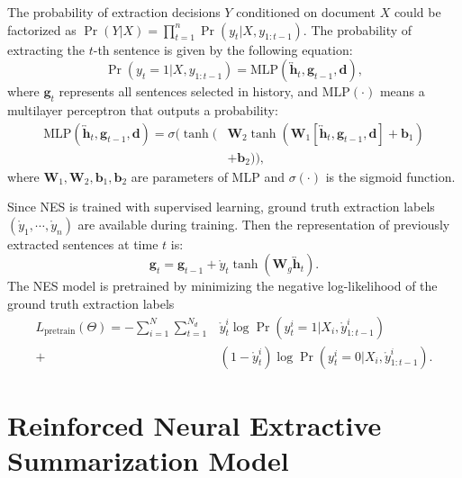 \documentclass[letterpaper]{article} %
\begin{document}
	The probability of extraction decisions $Y$ conditioned on document $X$ could be factorized as $\Pr(Y|X) = \prod_{t=1}^{n} \Pr(y_t | X, y_{1:t-1})$.
	The probability of extracting the $t$-th sentence is given by the following equation:
	\begin{equation} \label{eq:mlp}
		 \Pr(y_t=1|X, y_{1:t-1}) = \text{MLP}(\overleftrightarrow{\mathbf{h}}_t, \mathbf{g}_{t-1}, \mathbf{d} ) ,
	\end{equation}
	where $\mathbf{g}_t$ represents all sentences selected in history, and $\text{MLP}(\cdot)$ means a multilayer perceptron that outputs a probability:
	\begin{align*}
	\text{MLP}(\overleftrightarrow{\mathbf{h}}_t, \mathbf{g}_{t-1}, \mathbf{d} ) =  \sigma( \tanh ( & \mathbf{W}_2 \tanh(\mathbf{W}_1 [\overleftrightarrow{\mathbf{h}}_t, \mathbf{g}_{t-1}, \mathbf{d}] + \mathbf{b}_1) \\
	 &+ \mathbf{b}_2) ),
	\end{align*}
	where $\mathbf{W}_{1},\mathbf{W}_{2}, \mathbf{b}_{1}, \mathbf{b}_{2}$ are parameters of MLP and $\sigma(\cdot)$ is the sigmoid function. 
	
	Since NES is trained with supervised learning, ground truth extraction labels $(\mathring{y}_1, \cdots, \mathring{y}_n)$ are available during training. Then the representation of previously extracted sentences at time $t$ is:
	\begin{equation}
	\mathbf{g}_t =  \mathbf{g}_{t-1} + \mathring{y}_t \tanh (\mathbf{W}_{g} \overleftrightarrow{\mathbf{h}}_t)  .
	\end{equation}
	The NES model is pretrained by minimizing the negative log-likelihood of the ground truth extraction labels
	\begin{align*}
	L_{\text{pretrain}}(\Theta) = - \sum_{i=1}^{N} \sum_{t=1}^{N_d} & \mathring{y}_t^i \log \Pr(y_t^i=1|X_i, \mathring{y}_{1:t-1}^i)\\ 
	 + & (1 - \mathring{y}_t^i) \log \Pr(y_t^i=0|X_i, \mathring{y}_{1:t-1}^i) .
	\end{align*}
	
	\section{Reinforced Neural Extractive Summarization Model}
	\label{sec:rl}
    
\end{document}
